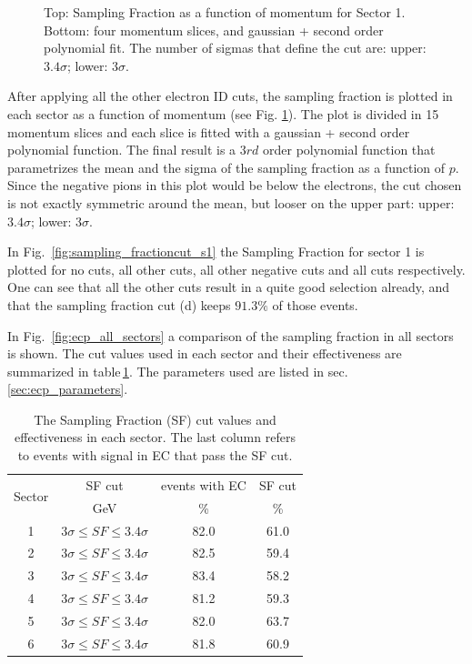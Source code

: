 \begin{figure}[h]
		\caption{Top: Sampling Fraction as a function of momentum for Sector 1.
					Bottom: four momentum slices, and gaussian + second order 
					polynomial fit. The number of sigmas that define the
               cut are: upper: $3.4\sigma$; lower: $3\sigma$.}
 		\label{fig:sampling_fraction_s1}
\end{figure}

After applying all the other electron ID cuts, the sampling fraction is plotted in each sector
as a function of momentum (see Fig. \ref{fig:sampling_fraction_s1}). 
The plot is divided in 15 momentum slices
and each slice is fitted with a gaussian + second order polynomial function. The final result
is a $3rd$ order polynomial function that parametrizes the mean and the sigma of the 
sampling fraction as a function of $p$.
Since the negative pions in this plot would be below the electrons, the cut chosen is not exactly
symmetric around the mean, but looser on the upper part: upper: $3.4\sigma$; lower: $3\sigma$.

In Fig.~\ref{fig:sampling_fractioncut_s1} the Sampling Fraction for sector 1 is plotted for
no cuts, all other cuts, all other negative cuts and all cuts respectively. One can see 
that all the other cuts result in a quite good selection already, and that the sampling 
fraction cut (d) keeps  $91.3\%$ of those events.

In Fig.~\ref{fig:ecp_all_sectors} a comparison of the sampling fraction in all sectors is shown.
The cut values used in each sector and their effectiveness are summarized in 
table\,\ref{tab:sfcut}. The parameters used are listed in sec.\ref{sec:ecp_parameters}.

\vspace{0.1cm}
\begin{table}[h]
\label{tab:sfcut}
	\begin{center}
		\begin{tabular}{c | c | c | c}
			\hline 
			\multirow{2}{*}{Sector} 
					& SF cut & events with EC & SF cut\\
					&  GeV & \% & \% \\
			\hline
			1   & $3\sigma \leq SF \leq 3.4\sigma$ & 82.0 & 61.0 \\
			2   & $3\sigma \leq SF \leq 3.4\sigma$ & 82.5 & 59.4 \\
			3   & $3\sigma \leq SF \leq 3.4\sigma$ & 83.4 & 58.2 \\
			4   & $3\sigma \leq SF \leq 3.4\sigma$ & 81.2 & 59.3 \\
			5   & $3\sigma \leq SF \leq 3.4\sigma$ & 82.0 & 63.7 \\
			6   & $3\sigma \leq SF \leq 3.4\sigma$ & 81.8 & 60.9 \\
			\hline 
		\end{tabular}
		\caption{The Sampling Fraction (SF) cut values and effectiveness in each sector.
					The last column refers to events with signal in EC that pass the SF cut.}	
	\end{center}
\end{table}


